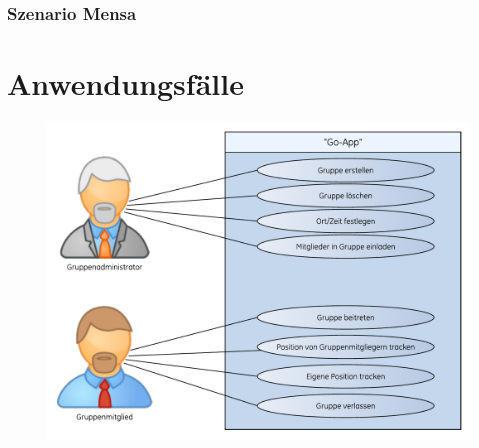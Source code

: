 \subsubsection{Szenario Mensa}


\newpage
\section{Anwendungsfälle}
\begin{figure} [H]
	\centering
	\includegraphics[scale=0.8, trim=2cm 0 0 0cm]{res/anwendungsfall.pdf}
\end{figure}
%
